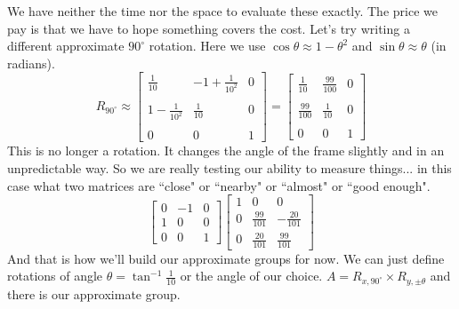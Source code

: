 \documentclass[12pt]{article}
\begin{document}
We have neither the time nor the space to evaluate these exactly.  The price we pay is that we have to hope something covers the cost.  Let's try writing a different approximate $90^\circ$ rotation.  Here we use $\cos \theta \approx 1 - \theta^2$ and $\sin \theta \approx \theta$ (in radians).   
$$R_{90^\circ} \approx \left[\begin{array}{rrr} 
\frac{1}{10} & -1 + \frac{1}{10^2} & 0 \\ \\ 
1 - \frac{1}{10^2} & \frac{1}{10} & 0  \\ \\
0 & 0 & 1\end{array} \right] = 
\left[\begin{array}{rrr} 
\frac{1}{10} & \frac{99}{100} & 0 \\ \\ 
\frac{99}{100} & \frac{1}{10} & 0  \\ \\
0 & 0 & 1\end{array} \right]  $$
This is no longer a rotation.  It changes the angle of the frame slightly and in an unpredictable way.  So we are really testing our ability to measure things... in this case what two matrices are ``close" or ``nearby" or ``almost" or ``good enough". 
$$ \left[\begin{array}{rrr} 
0 & -1 & 0 \\ 
1 & 0 & 0 \\
0 & 0 & 1\end{array} \right]\left[ 
\begin{array}{ccr}
1 & 0 & 0 \\
0 & \frac{99}{101} & -\frac{20}{101} \\
0 & \frac{20}{101} & \frac{99}{101} \end{array}\right] $$
And that is how we'll build our approximate groups for now.  We can just define rotations of angle $\theta = \tan^{-1}\frac{1}{10}$ or the angle of our choice.  $A = R_{x,90^\circ} \times R_{y, \pm \theta}$ and there is our approximate group.
\newpage
\end{document}
